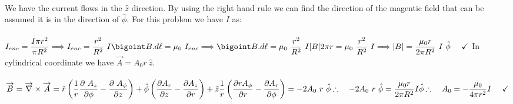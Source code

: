 \documentclass[fleqn]{article}
\begin{document}
\begin{enumerate}
      \textcolor{hwColor}{
        \\
        We have the current flows in the $\hat{z}$ direction. By using the right hand rule we can find the direction of the magentic field 
        that can be assumed it is in the direction of $\hat{\phi}$. For this problem we have $I$ as: 
        \\
        \\
        $
          I_{enc}=\dfrac{I \pi r^2}{\pi R^2} \Longrightarrow I_{enc}=\dfrac{r^2}{R^2} ~ I
          \\
          \\
          \\
          \bigoint B.d\ell=\mu_0 ~ I_{enc} \Longrightarrow \bigoint B.d\ell=\mu_0 ~ \dfrac{r^2}{R^2} ~ I
          \\
          \\
          \\
          |B| 2 \pi r=\mu_0 ~ \dfrac{r^2}{R^2} ~ I \Longrightarrow |B|=\dfrac{\mu_0 r}{2 \pi R^2} ~ I ~ \hat{\phi} ~~~~ \checkmark
          \\
          \\
          \\
        $
        In cylindrical coordinate we have $\overrightarrow{A}=A_0 r ~ \hat{z}$.
        \\
        \\
        $
          \overrightarrow{B}= \overrightarrow{\nabla} \times \overrightarrow{A}
          =\hat{r} \left(\dfrac{1}{r} \dfrac{\partial ~ A_z}{\partial \phi}-\dfrac{\partial ~ A_{\phi}}{\partial z} \right)
          +\hat{\phi} \left(\dfrac{\partial A_r}{\partial z}-\dfrac{\partial A_z}{\partial r}\right)
          +\hat{z} \dfrac{1}{r} \left(\dfrac{\partial r A_{\phi}}{\partial r}-\dfrac{\partial A_r}{\partial \phi}\right)
          =-2A_0 ~ r ~ \hat{\phi}
          \\
          \\
          \\
          \therefore ~~~ -2A_0 ~ r ~ \hat{\phi}=\dfrac{\mu_0 r}{2 \pi R^2} I \hat{\phi}
          \\
          \\
          \\
          \therefore ~~~ A_0=-\dfrac{\mu_0}{4 \pi r^2}I ~~~~ \checkmark
        $
        \\
        \\
      }
    
  \end{enumerate}
\end{document}

